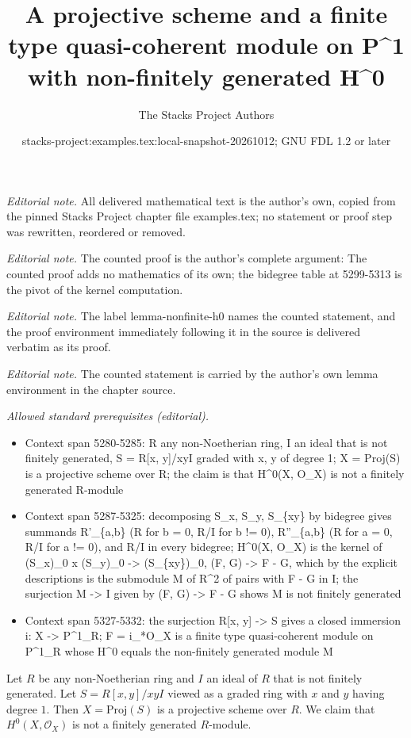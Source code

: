 \documentclass[10pt,a4paper]{amsart}
\title{A projective scheme and a finite type quasi-coherent module on P\textasciicircum{}1 with non-finitely generated H\textasciicircum{}0}
\author{The Stacks Project Authors}
\date{stacks-project:examples.tex:local-snapshot-20261012; GNU FDL 1.2 or later}
\theoremstyle{plain}
\theoremstyle{definition}
\theoremstyle{remark}
\numberwithin{equation}{subsection}
\begin{document}
\maketitle
\noindent\textit{Editorial note.} All delivered mathematical text is the author's own, copied from the pinned Stacks Project chapter file examples.tex; no statement or proof step was rewritten, reordered or removed.\par\medskip
\noindent\textit{Editorial note.} The counted proof is the author's complete argument: The counted proof adds no mathematics of its own; the bidegree table at 5299-5313 is the pivot of the kernel computation.\par\medskip
\noindent\textit{Editorial note.} The label lemma-nonfinite-h0 names the counted statement, and the proof environment immediately following it in the source is delivered verbatim as its proof.\par\medskip
\noindent\textit{Editorial note.} The counted statement is carried by the author's own lemma environment in the chapter source.\par\medskip
\noindent\textit{Allowed standard prerequisites (editorial).}\begin{itemize}
\item Context span 5280-5285: R any non-Noetherian ring, I an ideal that is not finitely generated, S = R[x, y]/xyI graded with x, y of degree 1; X = Proj(S) is a projective scheme over R; the claim is that H\textasciicircum{}0(X, O\_X) is not a finitely generated R-module
\item Context span 5287-5325: decomposing S\_x, S\_y, S\_\{xy\} by bidegree gives summands R'\_\{a,b\} (R for b = 0, R/I for b != 0), R''\_\{a,b\} (R for a = 0, R/I for a != 0), and R/I in every bidegree; H\textasciicircum{}0(X, O\_X) is the kernel of (S\_x)\_0 x (S\_y)\_0 -> (S\_\{xy\})\_0, (F, G) -> F - G, which by the explicit descriptions is the submodule M of R\textasciicircum{}2 of pairs with F - G in I; the surjection M -> I given by (F, G) -> F - G shows M is not finitely generated
\item Context span 5327-5332: the surjection R[x, y] -> S gives a closed immersion i: X -> P\textasciicircum{}1\_R; F = i\_*O\_X is a finite type quasi-coherent module on P\textasciicircum{}1\_R whose H\textasciicircum{}0 equals the non-finitely generated module M
\end{itemize}\medskip
Let $R$ be any non-Noetherian ring and $I$ an ideal of $R$
that is not finitely generated. Let $S = R[x, y]/xyI$ viewed
as a graded ring with $x$ and $y$ having degree $1$.
Then $X = \text{Proj}(S)$ is a projective scheme over $R$.
We claim that $H^0(X, \mathcal{O}_X)$ is not
a finitely generated $R$-module.
\end{document}
